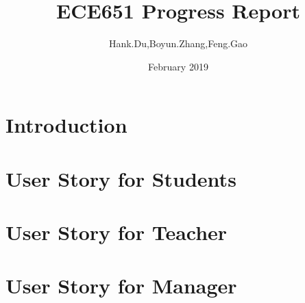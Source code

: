 \documentclass{article}
\title{ECE651 Progress Report}
\author{Hank.Du,Boyun.Zhang,Feng.Gao }
\date{February 2019}
\begin{document}
\maketitle

\section{Introduction}

\section{User Story for Students}



\section{User Story for Teacher}


\section{User Story for Manager}

\end{document}
